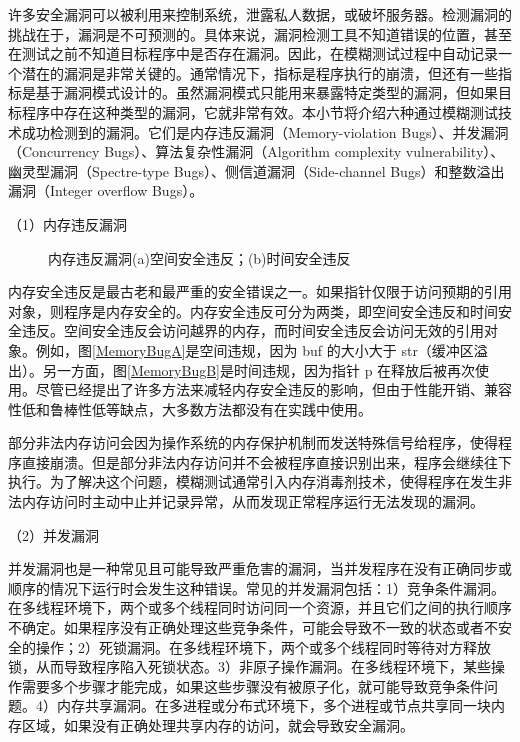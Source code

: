 \documentclass[master]{thesis-uestc}
\begin{document}
许多安全漏洞可以被利用来控制系统，泄露私人数据，或破坏服务器。检测漏洞的挑战在于，漏洞是不可预测的。具体来说，漏洞检测工具不知道错误的位置，甚至在测试之前不知道目标程序中是否存在漏洞。因此，在模糊测试过程中自动记录一个潜在的漏洞是非常关键的。通常情况下，指标是程序执行的崩溃，但还有一些指标是基于漏洞模式设计的。虽然漏洞模式只能用来暴露特定类型的漏洞，但如果目标程序中存在这种类型的漏洞，它就非常有效。本小节将介绍六种通过模糊测试技术成功检测到的漏洞。它们是内存违反漏洞（Memory-violation Bugs）、并发漏洞（Concurrency Bugs）、算法复杂性漏洞（Algorithm complexity vulnerability）、幽灵型漏洞（Spectre-type Bugs）、侧信道漏洞（Side-channel Bugs）和整数溢出漏洞（Integer overflow Bugs）。

（1）内存违反漏洞

\begin{figure}[!htbp]
    \vspace{6pt}
    \caption{内存违反漏洞(a)空间安全违反；(b)时间安全违反}
    \label{MemoryBug}
\end{figure}

内存安全违反是最古老和最严重的安全错误之一。如果指针仅限于访问预期的引用对象，则程序是内存安全的。内存安全违反可分为两类，即空间安全违反和时间安全违反。空间安全违反会访问越界的内存，而时间安全违反会访问无效的引用对象。例如，图\ref{MemoryBugA}是空间违规，因为 buf 的大小大于 str（缓冲区溢出）。另一方面，图\ref{MemoryBugB}是时间违规，因为指针 p 在释放后被再次使用。尽管已经提出了许多方法来减轻内存安全违反的影响，但由于性能开销、兼容性低和鲁棒性低等缺点，大多数方法都没有在实践中使用。

部分非法内存访问会因为操作系统的内存保护机制而发送特殊信号给程序，使得程序直接崩溃。但是部分非法内存访问并不会被程序直接识别出来，程序会继续往下执行。为了解决这个问题，模糊测试通常引入内存消毒剂技术，使得程序在发生非法内存访问时主动中止并记录异常，从而发现正常程序运行无法发现的漏洞。

（2）并发漏洞

并发漏洞也是一种常见且可能导致严重危害的漏洞，当并发程序在没有正确同步或顺序的情况下运行时会发生这种错误。常见的并发漏洞包括：1）竞争条件漏洞。在多线程环境下，两个或多个线程同时访问同一个资源，并且它们之间的执行顺序不确定。如果程序没有正确处理这些竞争条件，可能会导致不一致的状态或者不安全的操作；2）死锁漏洞。在多线程环境下，两个或多个线程同时等待对方释放锁，从而导致程序陷入死锁状态。3）非原子操作漏洞。在多线程环境下，某些操作需要多个步骤才能完成，如果这些步骤没有被原子化，就可能导致竞争条件问题。4）内存共享漏洞。在多进程或分布式环境下，多个进程或节点共享同一块内存区域，如果没有正确处理共享内存的访问，就会导致安全漏洞。
\end{document}
